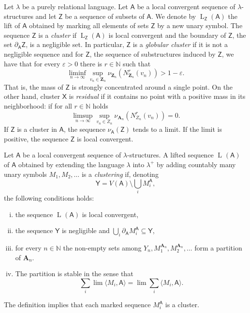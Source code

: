 \documentclass[11pt]{article}
\theoremstyle{plain}
\theoremstyle{definition}
\theoremstyle{remark}
\newcommand{\N}{\mathbb{N}}
\newcommand{\stonepar}[2]{\langle #1, #2 \rangle}
\newcommand{\str}[1]{\mathbf{#1}}
\newcommand{\strseq}[1]{{\boldsymbol{\mathsf{#1}}}}
\newcommand{\seq}[1]{{\mathsf{#1}}}
\newcommand{\eps}{\varepsilon}
\DeclareMathOperator{\liftsym}{L}
\newcommand{\lift}[2]{\liftsym_{#1}({#2})}
\begin{document}
Let $\lambda$ be a purely relational language.
Let $\strseq{A}$ be a local convergent sequence of $\lambda$-structures and let $\seq{Z}$ be a sequence of subsets of $\strseq{A}$.
We denote by $\lift{\seq{Z}}{\strseq{A}}$ the lift of $\strseq{A}$ obtained by marking all elements of sets $\seq{Z}$ by a new unary symbol.
The sequence $\seq{Z}$ is a \emph{cluster} if $\lift{\seq{Z}}{\strseq{A}}$ is local convergent and the boundary of $\seq{Z}$, the set $\partial_\strseq{A} \seq{Z}$, is a negligible set.
In particular, $\seq{Z}$ is a \emph{globular cluster} if it is not a negligible sequence and for $\strseq{Z}$, the sequence of substructures induced by $\seq{Z}$, we have that for every $\eps > 0$ there is $r \in \N$ such that
\[
    \liminf_{n \to \infty} \sup_{v_n \in \str{Z}_n} \nu_{\str{Z}_n}(N^r_{\str{Z}_n}(v_n)) > 1-\eps
    .
\]
That is, the mass of $\seq{Z}$ is strongly concentrated around a single point.
On the other hand, cluster $\seq{X}$ is \emph{residual} if it contains no point with a positive mass in its neighborhood: 
if for all $r \in \N$ holds
\[
    \limsup_{n \to \infty} \sup_{v_n \in Z_n} \nu_{\str{A}_n}(N^r_{Z_n}(v_n)) = 0
    .
\]
If $\seq{Z}$ is a cluster in $\strseq{A}$, the sequence $\nu_\strseq{A}(\seq{Z})$ tends to a limit.
If the limit is positive, the sequence $\strseq{Z}$ is local convergent.

Let $\strseq{A}$ be a local convergent sequence of $\lambda$-structures.
A lifted sequence $\lift{}{\strseq{A}}$ of $\strseq{A}$ obtained by extending the language $\lambda$ into $\lambda^+$ by adding countably many unary symbols $M_1, M_2, \dots$ is a \emph{clustering} if, denoting
\[
    \seq{Y} = V(\strseq{A}) \setminus \bigcup_i M_i^\strseq{A}
    ,
\]
the following conditions holds:
\begin{enumerate}[(i)]
    \item the sequence $\lift{}{\strseq{A}}$ is local convergent,
    \item the sequence $\seq{Y}$ is negligible and $\bigcup_i \partial_\strseq{A} M_i^\strseq{A} \subseteq \seq{Y}$,
    \item for every $n \in \N$ the non-empty sets among $Y_n, M_1^{\str{A}_n}, M_2^{\str{A}_n}, \dots$ form a partition of $\str{A}_n$.
    \item The partition is stable in the sense that
    \[
        \sum_i \lim \stonepar{M_i}{\strseq{A}} = \lim \sum_i \stonepar{M_i}{\strseq{A}}
        .
    \]
\end{enumerate}

The definition implies that each marked sequence $M_i^\strseq{A}$ is a cluster.
\end{document}
